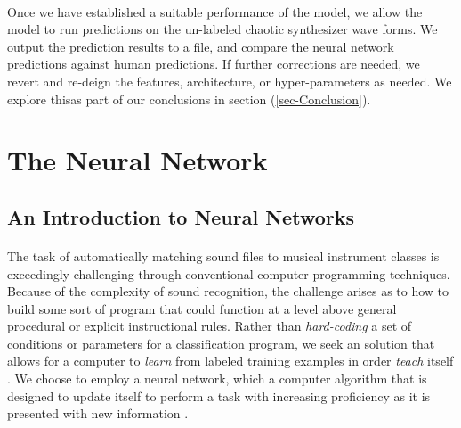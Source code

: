 \documentclass[12pt,letterpaper]{article}
\begin{document}
\paragraph*{}Once we have established a suitable performance of the model, we allow the model to run predictions on the un-labeled chaotic synthesizer wave forms. We output the prediction results to a file, and compare the neural network predictions against human predictions. If further corrections are needed, we revert and re-deign the features, architecture, or hyper-parameters as needed. We explore thisas part of our conclusions in section (\ref{sec-Conclusion}).


\newpage
\section{The Neural Network}
\label{sec-TheNeuralNetwork}


\subsection{An Introduction to Neural Networks}
\label{subsec-NerualNetworkIntro}

\paragraph*{}The task of automatically matching sound files to musical instrument classes is exceedingly challenging through conventional computer programming techniques. Because of the complexity of sound recognition, the challenge arises as to how to build some sort of program that could function at a level above general procedural or explicit instructional rules. Rather than \textit{hard-coding} a set of conditions or parameters for a classification program, we seek an solution that allows for a computer to \textit{learn} from labeled training examples in order \textit{teach} itself \cite{Bishop,Mitchell}. We choose to employ a neural network, which a computer algorithm that is designed to update itself to perform a task with increasing proficiency as it is presented with new information \cite{Geron2,Goodfellow,Levine,Mitchell}.
\end{document}
